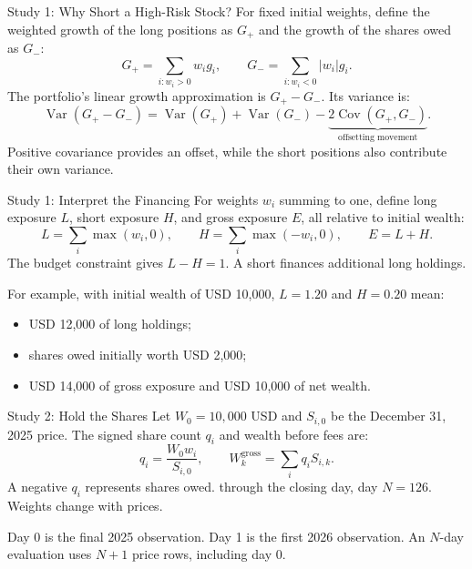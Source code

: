 \documentclass[aspectratio=169,11pt]{beamer}
\newcommand{\Var}{\operatorname{Var}}
\newcommand{\Cov}{\operatorname{Cov}}
\begin{document}
\begin{frame}{Study 1: Why Short a High-Risk Stock?}
For fixed initial weights, define the weighted growth of the long positions
as $G_+$ and the growth of the shares owed as $G_-$:
\[
 G_+=\sum_{i:w_i>0}w_i g_i,
 \qquad G_-=\sum_{i:w_i<0}|w_i|g_i.
\]
The portfolio's linear growth approximation is $G_+-G_-$. Its variance is:
\[
 \Var(G_+-G_-)=\Var(G_+)+\Var(G_-)
              -\underbrace{2\Cov(G_+,G_-)}_{\text{offsetting movement}}.
\]
Positive covariance provides an offset, while the short positions also
contribute their own variance. 
\end{frame}

\begin{frame}{Study 1: Interpret the Financing}
For weights $w_i$ summing to one, define long exposure $L$, short exposure
$H$, and gross exposure $E$, all relative to initial wealth:
\[
 L=\sum_i\max(w_i,0),\qquad
 H=\sum_i\max(-w_i,0),\qquad E=L+H.
\]
The budget constraint gives $L-H=1$. A short finances additional long holdings.

\vspace{0.8em}
For example, with initial wealth of USD 10,000, $L=1.20$ and $H=0.20$ mean:
\begin{itemize}\setlength{\itemsep}{0.35em}
\item USD 12,000 of long holdings;
\item shares owed initially worth USD 2,000;
\item USD 14,000 of gross exposure and USD 10,000 of net wealth.
\end{itemize}
\end{frame}

\begin{frame}{Study 2: Hold the Shares}
Let $W_0=10{,}000$ USD and $S_{i,0}$ be the December 31, 2025 price.
The signed share count $q_i$ and wealth before fees are:
\[
 q_i=\frac{W_0w_i}{S_{i,0}},
 \qquad
 W_k^{\mathrm{gross}}=\sum_i q_i S_{i,k}.
\]
A negative $q_i$ represents shares owed. 
through the closing day, day $N=126$. Weights change with prices.

\vspace{0.8em}
Day 0 is the final 2025 observation. Day 1 is the first 2026 observation.
An $N$-day evaluation uses $N+1$ price rows, including day 0.
\end{frame}
\end{document}
